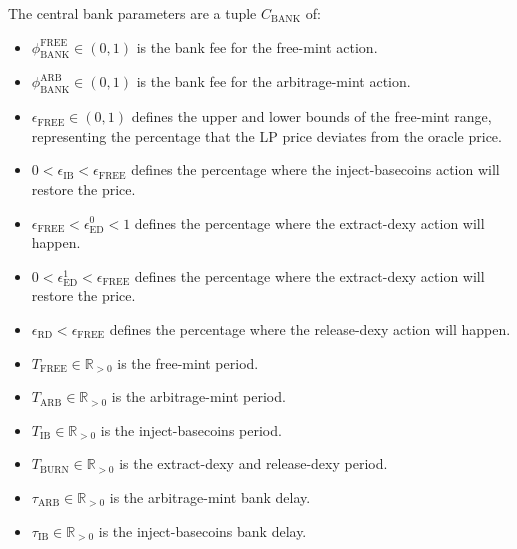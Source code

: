 \documentclass{ifcolog}
\begin{document}
The central bank parameters are a tuple $C_{\textrm{BANK}}$ of: \\

\begin{itemize}
  \item $\phi_{\textrm{BANK}}^{\textrm{FREE}} \in (0, 1)$ is the bank fee for the free-mint action.
  \item $\phi_{\textrm{BANK}}^{\textrm{ARB}} \in (0,1)$ is the bank fee for the arbitrage-mint action.
  \item $\epsilon_{\textrm{FREE}} \in (0, 1)$ defines the upper and lower bounds of the free-mint range, representing the percentage that the LP price deviates from the oracle price.
  \item $0 < \epsilon_{\textrm{IB}} < \epsilon_{\textrm{FREE}}$ defines the percentage where the inject-basecoins action will restore the price.
  \item $\epsilon_{\textrm{FREE}} < \epsilon_{\textrm{ED}}^{0} < 1$ defines the percentage where the extract-dexy action will happen.
  \item $0 < \epsilon_{\textrm{ED}}^{1} < \epsilon_{\textrm{FREE}}$ defines the percentage where the extract-dexy action will restore the price.
  \item $\epsilon_{\textrm{RD}} < \epsilon_{\textrm{FREE}}$ defines the percentage where the release-dexy action will happen.
  \item $T_{\textrm{FREE}} \in \mathbb{R}_{>0}$ is the free-mint period.
  \item $T_{\textrm{ARB}} \in \mathbb{R}_{>0}$ is the arbitrage-mint period.
  \item $T_{\textrm{IB}} \in \mathbb{R}_{>0}$ is the inject-basecoins period.
  \item $T_{\textrm{BURN}} \in \mathbb{R}_{>0}$ is the extract-dexy and release-dexy period.
  \item $\tau_{\textrm{ARB}} \in \mathbb{R}_{>0}$ is the arbitrage-mint bank delay.
  \item $\tau_{\textrm{IB}} \in \mathbb{R}_{>0}$ is the inject-basecoins bank delay.

\end{itemize}
\end{document}
